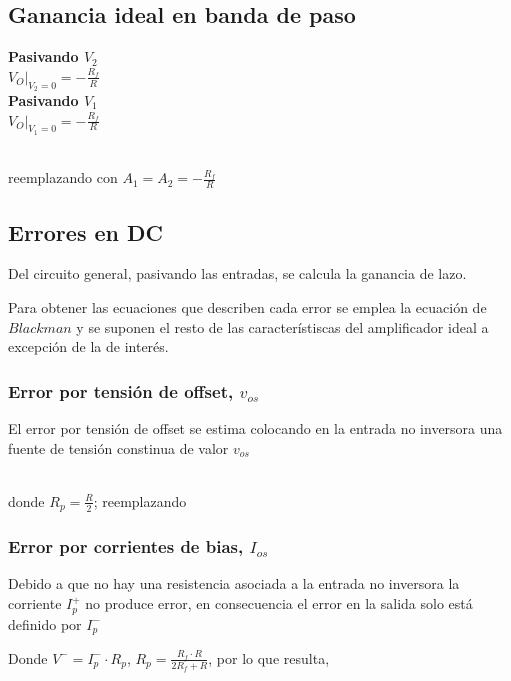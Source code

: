 \documentclass[11pt, a4paper]{article}
\begin{document}
\subsection{Ganancia ideal en banda de paso}
\onehalfspacing
\begin{flushleft}
    \textbf{Pasivando $V_2$}\\
    $V_{O}|_{V_2=0}=-\frac{R_f}{R}$ \\
    \textbf{Pasivando $V_{1}$} \\
    $V_{O}|_{V_{1}=0}=-\frac{R_f}{R}$ \\
\end{flushleft}
\begin{center}
    \\
    reemplazando con $A_1=A_2=-\frac{R_f}{R}$ \\
\end{center}

\subsection{Errores en DC}
\onehalfspacing
Del circuito general, pasivando las entradas, se calcula la ganancia de lazo.
\begin{center}
\end{center}
Para obtener las ecuaciones que describen cada error se emplea la ecuación de $Blackman$ y se suponen el resto de las característiscas del amplificador ideal a excepción de la de interés.

\subsubsection{Error por tensión de offset, $v_{os}$}
\onehalfspacing
El error por tensión de offset se estima colocando en la entrada no inversora una fuente de tensión constinua de valor $v_{os}$
\begin{center}
    \\
    donde $R_p=\frac{R}{2}$; reemplazando \\
\end{center}

\subsubsection{Error por corrientes de bias, $I_{os}$}
\onehalfspacing
Debido a que no hay una resistencia asociada a la entrada no inversora la corriente $I^{+}_p$ no produce error, en consecuencia el error en la salida solo está definido por $I^{-}_p$
\begin{center}
\end{center}
Donde $V^{-}=I^{-}_p\cdot R_p$, $R_p=\frac{R_f\cdot R}{2R_f+R}$, por lo que resulta,
\begin{center}
\end{center}
\end{document}

